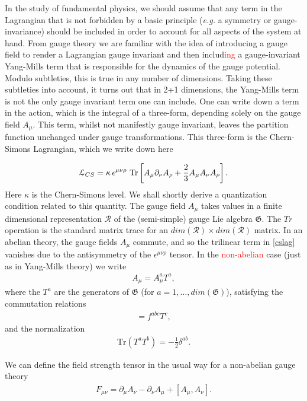     In the study of fundamental physics, we should assume that any term in the Lagrangian that is not forbidden by a basic principle (\textit{e.g.} a symmetry or gauge-invariance) should be included in order to account for all aspects of the system at hand. From gauge theory we are familiar with the idea of introducing a gauge field to render a Lagrangian gauge invariant and then includ\textcolor{red}{ing} a gauge-invariant Yang-Mills term that is responsible for the dynamics of the gauge potential. Modulo subtleties, this is true in any number of dimensions. Taking these subtleties into account, it turns out that in 2+1 dimensions, the Yang-Mills term is not the only gauge invariant term one can include. One can write down a term in the action, which is the integral of a three-form, depending solely on the gauge field $A_{\mu}$. This term, whilst not manifestly gauge invariant, leaves the partition function unchanged under gauge transformations. This three-form is the Chern-Simons Lagrangian, which we write down here

\begin{equation}
    {\mathcal{L}}_{CS}= \kappa \, \epsilon^{\mu\nu\rho} \  \mathrm{Tr} \left[ A_\mu\partial_\nu A_\rho +{2\over 3} A_\mu A_\nu A_\rho \right].
\label{cslag}
\end{equation}
Here $\kappa$ is the Chern-Simons level. We shall shortly derive a quantization condition related to this quantity. The gauge field $A_\mu$ takes values in a finite dimensional representation $\mathcal{R}$ of the (semi-simple) gauge Lie algebra ${\mathfrak{G}}$. The $Tr$ operation is the standard matrix trace for an $dim(\mathcal{R})\times dim(\mathcal{R})$ matrix.  In an abelian theory, the gauge fields
$A_\mu$ commute, and so the trilinear term in \eqref{cslag} vanishes due to the
antisymmetry of the $\epsilon^{\mu\nu\rho}$ tensor. In the \textcolor{red}{non-abelian} case (just as in Yang-Mills theory) we write
\begin{align}
    A_\mu=A_\mu^a T^a,
\end{align}
 where the $T^a$ are the generators of ${\mathfrak{G}}$ (for $a=1,\dots, dim({\mathfrak{G}})$), satisfying the commutation relations
 \begin{align}
    [T^a,T^b]=f^{abc}T^c,
 \end{align}
and the normalization 
\begin{align}
    \mathrm{Tr}(T^a T^b)=-\frac{1}{2}\delta^{ab}.
\end{align}

We can define the field strength tensor in the usual way for a non-abelian gauge theory
\begin{align}
    F_{\mu \nu} = \partial_{\mu}A_{\nu} - \partial_{\nu} A_{\mu} + [A_{\mu}, A_{\nu}].
\end{align}




